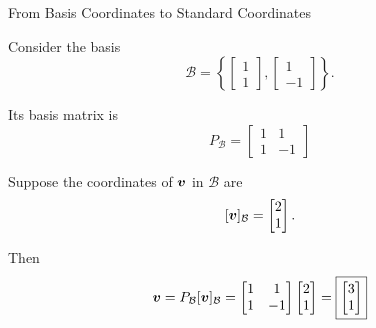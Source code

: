 \begin{frame}{From Basis Coordinates to Standard Coordinates}

Consider the basis
\vspace{-0.1cm}
\[
\mathcal{B}
=
\left\{
\begin{bmatrix}
1\\
1
\end{bmatrix},
\begin{bmatrix}
1\\
-1
\end{bmatrix}
\right\}.
\]

Its basis matrix is
\vspace{-0.1cm}
\[
\boxed{
P_{\mathcal{B}}
=
\begin{bmatrix}
1&1\\
1&-1
\end{bmatrix}
}
\]

\vspace{0.1cm}

Suppose the coordinates of $\bm{v}$ in $\mathcal{B}$ are
\vspace{-0.1cm}
\[
[\bm{v}]_{\mathcal{B}}
=
\begin{bmatrix}
2\\
1
\end{bmatrix}.
\]

Then
\vspace{-0.1cm}
\[
\bm{v}
=
P_{\mathcal{B}}[\bm{v}]_{\mathcal{B}}
=
\begin{bmatrix}
1&1\\
1&-1
\end{bmatrix}
\begin{bmatrix}
2\\
1
\end{bmatrix}
=
\boxed{
\begin{bmatrix}
3\\
1
\end{bmatrix}
}
\]

\end{frame}



